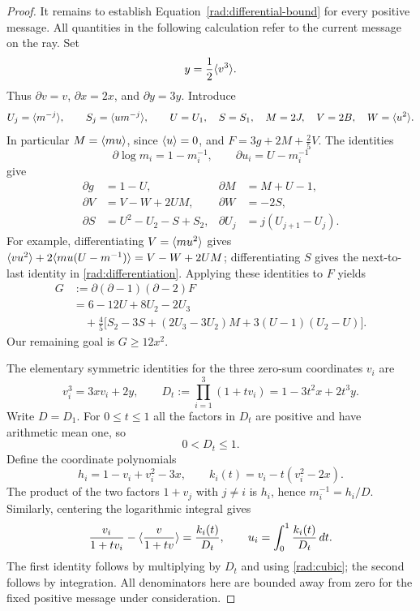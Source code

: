 \begin{proof}
It remains to establish Equation~\eqref{rad:differential-bound} for every
positive message. All quantities in the following calculation refer to the
current message on the ray. Set
\[
 y=\frac12\langle v^3\rangle.
\]
Thus $\partial v=v$, $\partial x=2x$, and $\partial y=3y$.
Introduce
\[
 U_j=\langle m^{-j}\rangle,\qquad S_j=\langle u m^{-j}\rangle,\qquad
 U=U_1,\quad S=S_1,\quad M=2J,\quad V=2B,\quad W=\langle u^2\rangle.
\]
In particular $M=\langle m u\rangle$, since $\langle u\rangle=0$, and
$F=3g+2M+\frac25V$.  The identities
\[
 \partial\log m_i=1-m_i^{-1},\qquad
 \partial u_i=U-m_i^{-1}
\]
give
\begin{equation}\label{rad:differentiation}
\begin{aligned}
 \partial g&=1-U,&
 \partial M&=M+U-1,\\
 \partial V&=V-W+2UM,&
 \partial W&=-2S,\\
 \partial S&=U^2-U_2-S+S_2,&
 \partial U_j&=j(U_{j+1}-U_j).
\end{aligned}
\end{equation}
For example, differentiating $V=\langle m u^2\rangle$ gives
$\langle v u^2\rangle+2\langle m u(U-m^{-1})\rangle=V-W+2UM$;
differentiating $S$ gives the next-to-last identity in
\eqref{rad:differentiation}.  Applying these identities to $F$ yields
\begin{equation}\label{rad:G}
\begin{aligned}
 G&:=\partial(\partial-1)(\partial-2)F\\
  &=6-12U+8U_2-2U_3\\
  &\quad+\frac45\bigl[S_2-3S+(2U_3-3U_2)M
                    +3(U-1)(U_2-U)\bigr].
\end{aligned}
\end{equation}
Our remaining goal is $G\geq12x^2$.

The elementary symmetric identities for the three zero-sum coordinates $v_i$
are
\begin{equation}\label{rad:cubic}
 v_i^3=3xv_i+2y,\qquad
 D_t:=\prod_{i=1}^3(1+t v_i)=1-3t^2x+2t^3y.
\end{equation}
Write $D=D_1$.  For $0\leq t\leq1$ all the factors in $D_t$ are positive
and have arithmetic mean one, so
\begin{equation}\label{rad:denominator-range}
 0<D_t\leq1.
\end{equation}
Define the coordinate polynomials
\[
 h_i=1-v_i+v_i^2-3x,\qquad
 k_i(t)=v_i-t(v_i^2-2x).
\]
The product of the two factors $1+v_j$ with $j\ne i$ is $h_i$, hence
$m_i^{-1}=h_i/D$.  Similarly, centering the logarithmic integral gives
\begin{equation}\label{rad:log-integral}
 \frac{v_i}{1+t v_i}-\langle \frac{v}{1+t v}\rangle
   =\frac{k_i(t)}{D_t},\qquad
 u_i=\int_0^1\frac{k_i(t)}{D_t}\,dt.
\end{equation}
The first identity follows by multiplying by $D_t$ and using
\eqref{rad:cubic}; the second follows by integration.  All denominators here
are bounded away from zero for the fixed positive message under consideration.


\end{proof}

